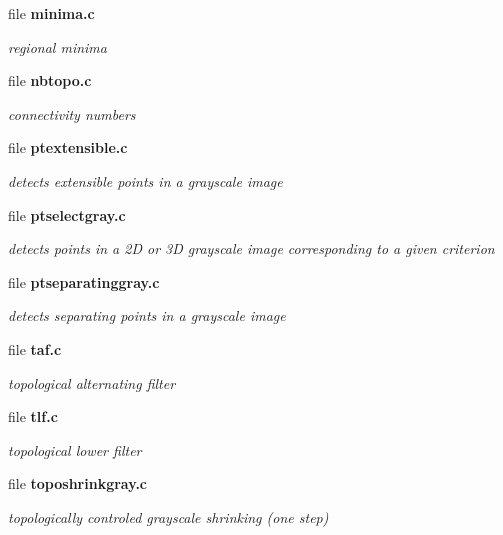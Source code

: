\begin{CompactItemize}
\item 
file \bf{minima.c}
\begin{CompactList}\small\item\em regional minima \item\end{CompactList}

\item 
file \bf{nbtopo.c}
\begin{CompactList}\small\item\em connectivity numbers \item\end{CompactList}

\item 
file \bf{ptextensible.c}
\begin{CompactList}\small\item\em detects extensible points in a grayscale image \item\end{CompactList}

\item 
file \bf{ptselectgray.c}
\begin{CompactList}\small\item\em detects points in a 2D or 3D grayscale image corresponding to a given criterion \item\end{CompactList}

\item 
file \bf{ptseparatinggray.c}
\begin{CompactList}\small\item\em detects separating points in a grayscale image \item\end{CompactList}

\item 
file \bf{taf.c}
\begin{CompactList}\small\item\em topological alternating filter \item\end{CompactList}

\item 
file \bf{tlf.c}
\begin{CompactList}\small\item\em topological lower filter \item\end{CompactList}

\item 
file \bf{toposhrinkgray.c}
\begin{CompactList}\small\item\em topologically controled grayscale shrinking (one step) \item\end{CompactList}


\end{CompactItemize}
